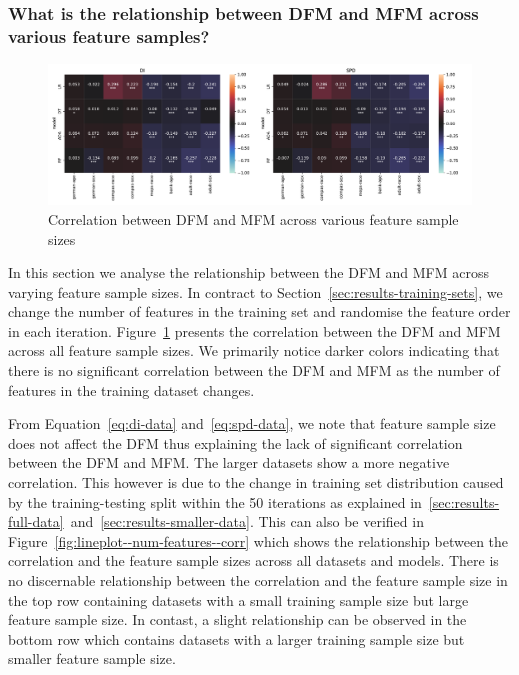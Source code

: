 \documentclass{article}
\begin{document}

\subsubsection{What is the relationship between DFM and MFM across various feature samples?}\label{sec:results-feature-sets}

\begin{figure}
  \centering
  \includegraphics[width=0.95\linewidth]{heatmap--corr--num-features.pdf}
  \caption{Correlation between DFM and MFM across various feature
    sample sizes}
  \label{fig:heatmap--corr--num-features}
\end{figure}

In this section we analyse the relationship between the DFM and MFM
across varying feature sample sizes. In contract to
Section \ref{sec:results-training-sets}, we change the number of
features in the training set and randomise the feature order in each
iteration. Figure \ref{fig:heatmap--corr--num-features} presents the
correlation between the DFM and MFM across all feature sample sizes.
We primarily notice darker colors indicating that there is no
significant correlation between the DFM and MFM as the number of
features in the training dataset changes.

From Equation \ref{eq:di-data} and \ref{eq:spd-data}, we note that
feature sample size does not affect the DFM thus explaining the lack
of significant correlation between the DFM and MFM. The larger
datasets show a more negative correlation. This however is due to the
change in training set distribution caused by the training-testing
split within the 50 iterations as explained
in \ref{sec:results-full-data} and \ref{sec:results-smaller-data}.
This can also be verified in
Figure \ref{fig:lineplot--num-features--corr} which shows the
relationship between the correlation and the feature sample sizes
across all datasets and models. There is no discernable relationship
between the correlation and the feature sample size in the top row
containing datasets with a small training sample size but large
feature sample size. In contast, a slight relationship can be observed
in the bottom row which contains datasets with a larger training
sample size but smaller feature sample size.
\end{document}
